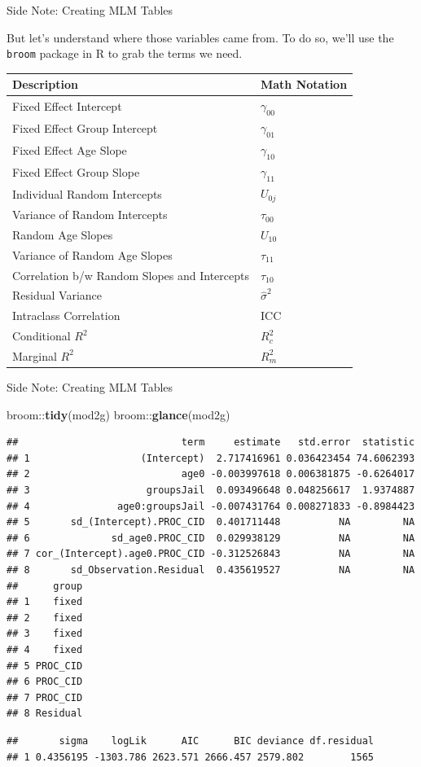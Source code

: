 \documentclass[ignorenonframetext,]{beamer}
\newenvironment{Shaded}{\begin{snugshade}}{\end{snugshade}}
\newcommand{\KeywordTok}[1]{\textcolor[rgb]{0.13,0.29,0.53}{\textbf{{#1}}}}
\newcommand{\NormalTok}[1]{{#1}}
\begin{document}
\begin{frame}[fragile]{Side Note: Creating MLM Tables}

But let's understand where those variables came from. To do so, we'll
use the \texttt{broom} package in R to grab the terms we need.

\begin{longtable}[]{@{}ll@{}}
\toprule
Description & Math Notation\tabularnewline
\midrule
\endhead
Fixed Effect Intercept & \(\gamma_{00}\)\tabularnewline
Fixed Effect Group Intercept & \(\gamma_{01}\)\tabularnewline
Fixed Effect Age Slope & \(\gamma_{10}\)\tabularnewline
Fixed Effect Group Slope & \(\gamma_{11}\)\tabularnewline
Individual Random Intercepts & \(U_{0j}\)\tabularnewline
Variance of Random Intercepts & \(\tau_{00}\)\tabularnewline
Random Age Slopes & \(U_{10}\)\tabularnewline
Variance of Random Age Slopes & \(\tau_{11}\)\tabularnewline
Correlation b/w Random Slopes and Intercepts &
\(\tau_{10}\)\tabularnewline
Residual Variance & \(\hat{\sigma}^2\)\tabularnewline
Intraclass Correlation & ICC\tabularnewline
Conditional \(R^2\) & \(R^2_c\)\tabularnewline
Marginal \(R^2\) & \(R^2_m\)\tabularnewline
\bottomrule
\end{longtable}

\end{frame}

\begin{frame}[fragile]{Side Note: Creating MLM Tables}

\begin{Shaded}
\begin{Highlighting}[]
\NormalTok{broom::}\KeywordTok{tidy}\NormalTok{(mod2g)}
\NormalTok{broom::}\KeywordTok{glance}\NormalTok{(mod2g)}
\end{Highlighting}
\end{Shaded}

\tiny

\begin{verbatim}
##                            term     estimate   std.error  statistic
## 1                   (Intercept)  2.717416961 0.036423454 74.6062393
## 2                          age0 -0.003997618 0.006381875 -0.6264017
## 3                    groupsJail  0.093496648 0.048256617  1.9374887
## 4               age0:groupsJail -0.007431764 0.008271833 -0.8984423
## 5       sd_(Intercept).PROC_CID  0.401711448          NA         NA
## 6              sd_age0.PROC_CID  0.029938129          NA         NA
## 7 cor_(Intercept).age0.PROC_CID -0.312526843          NA         NA
## 8       sd_Observation.Residual  0.435619527          NA         NA
##      group
## 1    fixed
## 2    fixed
## 3    fixed
## 4    fixed
## 5 PROC_CID
## 6 PROC_CID
## 7 PROC_CID
## 8 Residual
\end{verbatim}

\begin{verbatim}
##       sigma    logLik      AIC      BIC deviance df.residual
## 1 0.4356195 -1303.786 2623.571 2666.457 2579.802        1565
\end{verbatim}

\end{frame}
\end{document}
